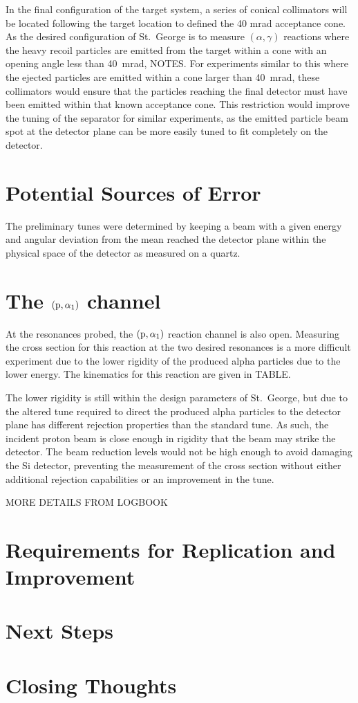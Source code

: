 In the final configuration of the target system, a series of conical
collimators will be located following the target location to defined the
40 mrad acceptance cone. As the desired configuration of St.\ George is
to measure $(\alpha,\gamma)$ reactions where the heavy recoil particles are
emitted from the target within a cone with an opening angle less than 40~mrad,
NOTES. For experiments similar to this where the ejected
particles are emitted within a cone larger than 40~mrad, these
collimators would ensure that the particles reaching the final detector
must have been emitted within that known acceptance cone. This
restriction would improve the tuning of the separator for similar
experiments, as the emitted particle beam spot at the detector plane can
be more easily tuned to fit completely on the detector.


\section{Potential Sources of Error}
\label{sec:potential-sources-of-error}

The preliminary tunes were determined by keeping a beam with a given
energy and angular deviation from the mean reached the detector plane
within the physical space of the detector as measured on a quartz.


\section{The $(\rm{p},\alpha_1)$ channel}
\label{sec:the-palpha_1-channel}

At the resonances probed, the $(\rm{p},\alpha_1)$ reaction channel is also
open. Measuring the cross section for this reaction at the two desired
resonances is a more difficult experiment due to the lower rigidity of
the produced alpha particles due to the lower energy. The kinematics for
this reaction are given in TABLE.

The lower rigidity is still within the design parameters of St.\ George,
but due to the altered tune required to direct the produced alpha
particles to the detector plane has different rejection properties than
the standard tune. As such, the incident proton beam is close enough in
rigidity that the beam may strike the detector. The beam reduction
levels would not be high enough to avoid damaging the Si detector,
preventing the measurement of the cross section without either
additional rejection capabilities or an improvement in the tune.

MORE DETAILS FROM LOGBOOK


\section{Requirements for Replication and Improvement}
\label{sec:requirements-for-replication-and-improvement}


\section{Next Steps}
\label{sec:next-steps}


\section{Closing Thoughts}
\label{sec:closing-thoughts}
